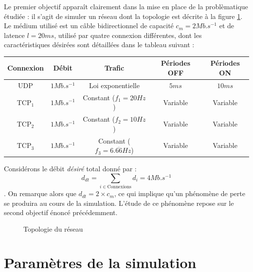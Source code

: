 \documentclass[a4paper]{article}
\begin{document}
Le premier objectif apparaît clairement dans la mise en place de la problèmatique étudiée : il
s'agit de simuler un réseau dont la topologie est décrite à la figure \ref{topologie}. Le médium
utilisé est un câble bidirectionnel de capacité $c_m = 2Mb.s^{-1}$ et de latence $l = 20 ms$, utilisé par
quatre connexion différentes, dont les caractéristiques désirées sont détaillées dans le tableau
suivant :

\begin{center}
\begin{tabular}{|c|c|c|c|c|}\hline
	Connexion & Débit & Trafic & Périodes OFF & Périodes ON \\\hline
	UDP & $1 Mb.s^{-1}$ & Loi exponentielle & $5ms$ & $10ms$ \\\hline
	TCP$_1$ & $1 Mb.s^{-1}$ & Constant ($ f_1 = 20 Hz$ ) & Variable & Variable \\\hline
	TCP$_2$ & $1 Mb.s^{-1}$ & Constant ($ f_2 = 10 Hz$) & Variable & Variable \\\hline
	TCP$_3$ & $1 Mb.s^{-1}$ & Constant ($ f_3 = 6.\overline{66} Hz$) & Variable & Variable \\\hline
\end{tabular}
\end{center}

Considérons le débit \textit{désiré} total donné par : $$
d_{dt} = \sum_{i \in \mbox{Connexions}} d_i = 4 Mb.s^{-1} $$.
On remarque alors que $d_{dt} = 2 \times c_m$, ce qui implique qu'un phénomène de perte se produira
au cours de la simulation. L'étude de ce phénomène repose sur le second objectif énoncé
précédemment.

\begin{figure}[h]
	\begin{center}
	\end{center}
	\caption{Topologie du réseau}
	\label{topologie}
\end{figure}


\section{Paramètres de la simulation}
\end{document}
